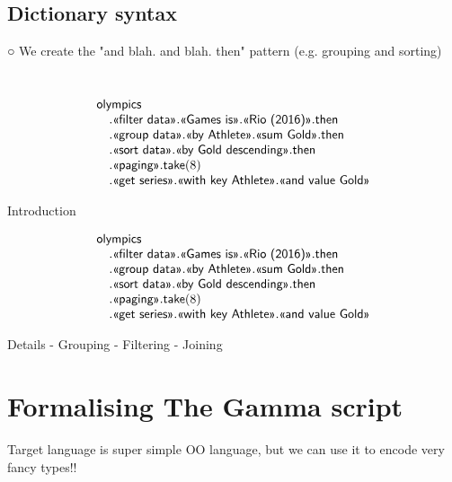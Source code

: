 \documentclass[a4paper,UKenglish]{lipics-v2016}
\newcommand{\ident}[1]{\textnormal{\sffamily #1}}
\newcommand{\qident}[1]{\textnormal{\sffamily \guillemotleft #1\guillemotright}}
\begin{document}
\subsection{Dictionary syntax}
\label{sec:analysis-and}
  ○ We create the "and blah. and blah. then" pattern
  (e.g. grouping and sorting)


~
\begin{equation*}
\begin{array}{l}
\ident{olympics}\\
\quad.\qident{filter data}.\qident{Games is}.\qident{Rio (2016)}.\ident{then}\\
\quad.\qident{group data}.\qident{by Athlete}.\qident{sum Gold}.\ident{then}\\
\quad.\qident{sort data}.\qident{by Gold descending}.\ident{then}\\
\quad.\qident{paging}.\ident{take}(8)\\
\quad.\qident{get series}.\qident{with key Athlete}.\qident{and value Gold}
\end{array}
\end{equation*}

Introduction

\begin{equation*}
\begin{array}{l}
\ident{olympics}\\
\quad.\qident{filter data}.\qident{Games is}.\qident{Rio (2016)}.\ident{then}\\
\quad.\qident{group data}.\qident{by Athlete}.\qident{sum Gold}.\ident{then}\\
\quad.\qident{sort data}.\qident{by Gold descending}.\ident{then}\\
\quad.\qident{paging}.\ident{take}(8)\\
\quad.\qident{get series}.\qident{with key Athlete}.\qident{and value Gold}
\end{array}
\end{equation*}

Details
 - Grouping
 - Filtering
 - Joining


\section{Formalising The Gamma script}
\label{sec:foo}


Target language is super simple OO language, but we can use it to encode very fancy types!!
\end{document}
